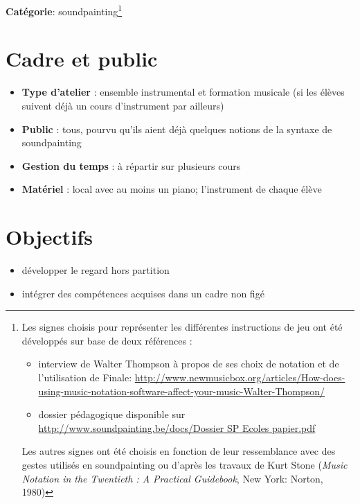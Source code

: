 \documentclass[a4paper,11pt,bibliography=totoc,numbers=noenddot,listof=flat,DIV=11,BCOR=0mm]{scrreprt}%
\begin{document}
{\large \textbf{Catégorie}}: soundpainting\footnote{Les signes choisis pour représenter les différentes instructions de jeu ont été développés sur base de deux références : 
\begin{itemize}
\item interview de Walter Thompson à propos de ses choix de notation et de l’utilisation de Finale: %
\href{http://www.newmusicbox.org/articles/How-does-using-music-notation-software-affect-your-music-Walter-Thompson/}{http://www.newmusicbox.org/articles/How-does-using-music-notation-software-affect-your-music-Walter-Thompson/}
\item dossier pédagogique disponible sur {\href{http://www.soundpainting.be/docs/Dossier{ }SP{ }Ecoles{ }papier.pdf}{http://www.soundpainting.be/docs/Dossier{ }SP{ }Ecoles{ }papier.pdf}}
\end{itemize}


Les autres signes ont été choisis en fonction de leur ressemblance avec des gestes utilisés en soundpainting ou d'après les travaux de Kurt Stone (\emph{Music Notation in the Twentieth : A Practical Guidebook}, New York: Norton, 1980)}

\section*{Cadre et public}
\begin{itemize}
\item [\textbullet]\textbf{Type d'atelier} : ensemble instrumental et formation musicale (si les élèves suivent déjà un cours d'instrument par ailleurs)

\item [\textbullet]\textbf{Public} : tous, pourvu qu'ils aient déjà quelques notions de la syntaxe de soundpainting

\item [\textbullet]\textbf{Gestion du temps} : à répartir sur plusieurs cours

\item [\textbullet]\textbf{Matériel} : local avec au moins un piano; l'instrument de chaque élève

\end{itemize}

\section*{Objectifs}
\begin{itemize}
\item développer le regard hors partition
\item intégrer des compétences acquises dans un cadre non figé
\end{itemize}
\end{document}
